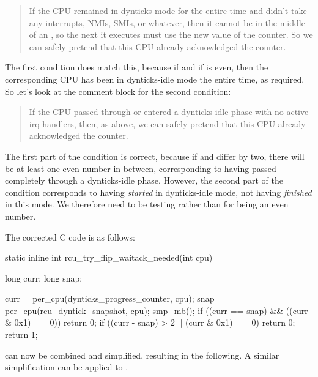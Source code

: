\begin{quote}
	If the CPU remained in dynticks mode for the entire time
	and didn't take any interrupts, NMIs, SMIs, or whatever,
	then it cannot be in the middle of an , so
	the next  it executes must use the new value
	of the counter.  So we can safely pretend that this CPU
	already acknowledged the counter.
\end{quote}

The first condition does match this, because if 
and if  is even, then the corresponding CPU has been
in dynticks-idle mode the entire time, as required.
So let's look at the comment block for the second condition:

\begin{quote}
	If the CPU passed through or entered a dynticks idle phase with
	no active irq handlers, then, as above, we can safely pretend
	that this CPU already acknowledged the counter.
\end{quote}

The first part of the condition is correct, because if 
and  differ by two, there will be at least one even
number in between, corresponding to having passed completely through
a dynticks-idle phase.
However, the second part of the condition corresponds to having
\emph{started} in dynticks-idle mode, not having \emph{finished}
in this mode.
We therefore need to be testing  rather than
 for being an even number.

The corrected C code is as follows:

\begin{fcvlabel}
\begin{VerbatimN}[commandchars=\\\[\]]
static inline int
rcu_try_flip_waitack_needed(int cpu)
{
	long curr;
	long snap;

	curr = per_cpu(dynticks_progress_counter, cpu);
	snap = per_cpu(rcu_dyntick_snapshot, cpu);
	smp_mb();
	if ((curr == snap) && ((curr & 0x1) == 0)) \lnlbl[if:b]
		return 0;
	if ((curr - snap) > 2 || (curr & 0x1) == 0)
		return 0;			\lnlbl[if:e]
	return 1;
}
\end{VerbatimN}
\end{fcvlabel}

\begin{fcvref}
 can now be combined and simplified,
resulting in the following.
A similar simplification can be applied to
.
\end{fcvref}

